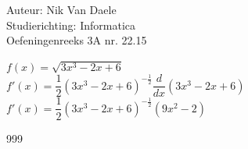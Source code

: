 \documentclass[a4paper]{article}
\begin{document}
  
\noindent \large Auteur: Nik Van Daele \\
\noindent \large Studierichting: Informatica\\
\noindent \large Oefeningenreeks 3A nr. 22.15\\

\medskip

\normalsize

$f(x) = \sqrt{3x^3 - 2x + 6}$\\

$f'(x) = \dfrac{1}{2}(3x^3 - 2x + 6)^{-\tfrac{1}{2}} \dfrac{d}{dx}(3x^3 - 2x + 6)$\\

$f'(x) = \dfrac{1}{2}(3x^3 - 2x + 6)^{-\tfrac{1}{2}} (9x^2 - 2)$\\

\begin{thebibliography}{999}
\end{thebibliography}
\end{document}
